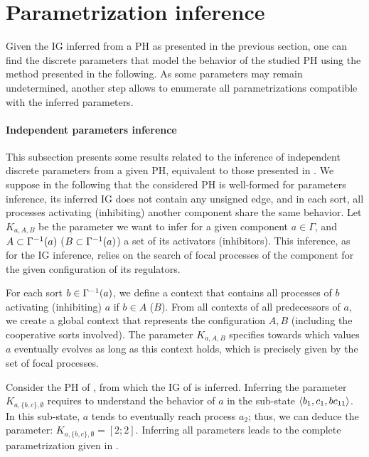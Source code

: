 \section{Parametrization inference}\label{sec:infer-K}

Given the IG inferred from a PH as presented in the previous section, one can find the discrete parameters that model the behavior of the studied PH using the method presented in the following.
As some parameters may remain undetermined, another step allows to enumerate all parametrizations compatible with the inferred parameters.

\paragraph{Independent parameters inference}
This subsection presents some results related to the inference of independent discrete parameters from a given PH,
equivalent to those presented in \cite{PMR10-TCSB}.
We suppose in the following that the considered PH is well-formed for parameters inference, \ie its inferred IG does not contain any unsigned edge,
and in each sort, all processes activating (\resp inhibiting) another component share the same behavior.
Let $K_{a,A,B}$ be the parameter we want to infer for a given component $a \in \Gamma$,
and $A \subset \Gamma^{-1}(a)$ (\resp $B \subset \Gamma^{-1}(a)$) a set of its activators (\resp inhibitors).
This inference, as for the IG inference, relies on the search of focal processes of the component for the given configuration of its regulators.

For each sort $b \in \Gamma^{-1}(a)$, we define a context that contains all processes of $b$ activating (\resp inhibiting) $a$ if $b \in A$ (\resp $B$).
From all contexts of all predecessors of $a$, we create a global context that represents the configuration $A,B$ (including the cooperative sorts involved).
The parameter $K_{a,A,B}$ specifies towards which values $a$ eventually evolves as long as this context holds, which is precisely given by the set of focal processes.

\begin{example*}
Consider the PH of , from which the IG of  is inferred.
Inferring the parameter $K_{a,\{b,c\},\emptyset}$ requires to understand the behavior of $a$ in the sub-state $\langle b_1, c_1, bc_{11} \rangle$.
In this sub-state, $a$ tends to eventually reach process $a_2$; thus, we can deduce the parameter: $K_{a,\{b,c\},\emptyset} = [2 ; 2]$.
Inferring all parameters leads to the complete parametrization given in .
\end{example*}

